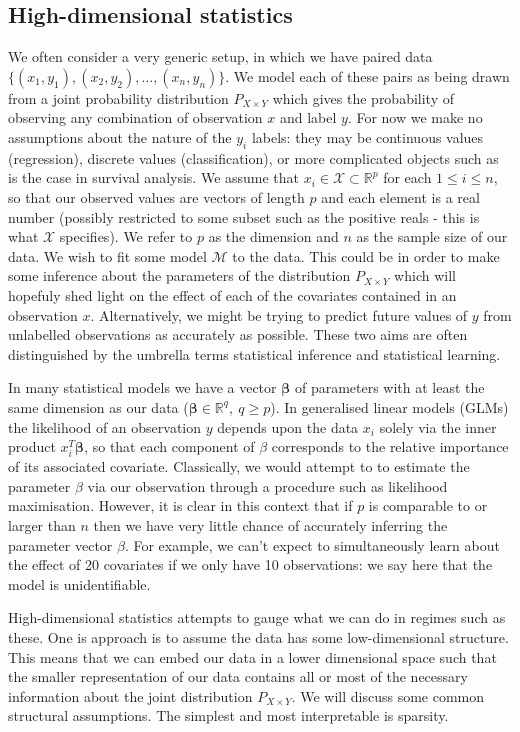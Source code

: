 \documentclass[thesis.tex]{subfiles}
\begin{document}
\subsection{High-dimensional statistics}
We often consider a very generic setup, in which we have paired data $\{(x_1, y_1), (x_2, y_2), \dots, (x_n, y_n)\}$. We model each of these pairs as being drawn from a joint probability distribution $P_{X \times Y}$ which gives the probability of observing any combination of observation $x$ and label $y$. For now we make no assumptions about the nature of the $y_i$ labels: they may be continuous values (regression), discrete values (classification), or more complicated objects such as is the case in survival analysis. We assume that $x_i \in \mathcal{X} \subset \mathbb{R}^p$ for each $1 \leq i \leq n$, so that our observed values are vectors of length $p$ and each element is a real number (possibly restricted to some subset such as the positive reals - this is what $\mathcal{X}$ specifies). We refer to $p$ as the dimension and $n$ as the sample size of our data. We wish to fit some model $\mathcal{M}$ to the data. This could be in order to make some inference about the parameters of the distribution $P_{X \times Y}$ which will hopefuly shed light on the effect of each of the covariates contained in an observation $x$. Alternatively, we might be trying to predict future values of $y$ from unlabelled observations as accurately as possible. These two aims are often distinguished by the umbrella terms statistical inference and statistical learning.

In many statistical models we have a vector $\mathbf{\beta}$ of parameters with at least the same dimension as our data ($\mathbf{\beta} \in \mathbb{R}^q, \ q \geq p$). In generalised linear models (GLMs) the likelihood of an observation $y$ depends upon the data $x_i$ solely via the inner product $x_i^T\mathbf{\beta}$, so that each component of $\beta$ corresponds to the relative importance of its associated covariate. Classically, we would attempt to to estimate the parameter $\beta$ via our observation through a procedure such as likelihood maximisation. However, it is clear in this context that if $p$ is comparable to or larger than $n$ then we have very little chance of accurately inferring the parameter vector $\beta$. For example, we can't expect to simultaneously learn about the effect of 20 covariates if we only have 10 observations: we say here that the model is unidentifiable. 

High-dimensional statistics attempts to gauge what we can do in regimes such as these. One is approach is to assume the data has some low-dimensional structure. This means that we can embed our data in a lower dimensional space such that the smaller representation of our data contains all or most of the necessary information about the joint distribution $P_{X\times Y}$. We will discuss some common structural assumptions. The simplest and most interpretable is sparsity. \\~\\
\end{document}
